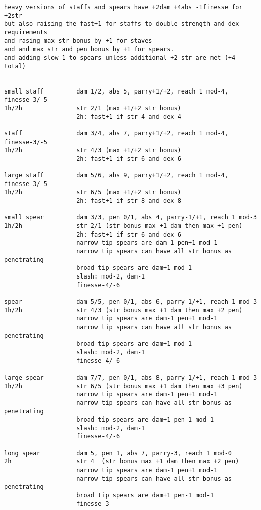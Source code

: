\begin{verbatim}
heavy versions of staffs and spears have +2dam +4abs -1finesse for +2str
but also raising the fast+1 for staffs to double strength and dex requirements
and rasing max str bonus by +1 for staves 
and and max str and pen bonus by +1 for spears.
and adding slow-1 to spears unless additional +2 str are met (+4 total)


small staff         dam 1/2, abs 5, parry+1/+2, reach 1 mod-4, finesse-3/-5
1h/2h               str 2/1 (max +1/+2 str bonus)
                    2h: fast+1 if str 4 and dex 4

staff               dam 3/4, abs 7, parry+1/+2, reach 1 mod-4, finesse-3/-5
1h/2h               str 4/3 (max +1/+2 str bonus)
                    2h: fast+1 if str 6 and dex 6

large staff         dam 5/6, abs 9, parry+1/+2, reach 1 mod-4, finesse-3/-5
1h/2h               str 6/5 (max +1/+2 str bonus)
                    2h: fast+1 if str 8 and dex 8

small spear         dam 3/3, pen 0/1, abs 4, parry-1/+1, reach 1 mod-3
1h/2h               str 2/1 (str bonus max +1 dam then max +1 pen)
                    2h: fast+1 if str 6 and dex 6
                    narrow tip spears are dam-1 pen+1 mod-1
                    narrow tip spears can have all str bonus as penetrating
                    broad tip spears are dam+1 mod-1
                    slash: mod-2, dam-1
                    finesse-4/-6

spear               dam 5/5, pen 0/1, abs 6, parry-1/+1, reach 1 mod-3
1h/2h               str 4/3 (str bonus max +1 dam then max +2 pen)
                    narrow tip spears are dam-1 pen+1 mod-1
                    narrow tip spears can have all str bonus as penetrating
                    broad tip spears are dam+1 mod-1
                    slash: mod-2, dam-1
                    finesse-4/-6

large spear         dam 7/7, pen 0/1, abs 8, parry-1/+1, reach 1 mod-3
1h/2h               str 6/5 (str bonus max +1 dam then max +3 pen)
                    narrow tip spears are dam-1 pen+1 mod-1
                    narrow tip spears can have all str bonus as penetrating
                    broad tip spears are dam+1 pen-1 mod-1
                    slash: mod-2, dam-1
                    finesse-4/-6

long spear          dam 5, pen 1, abs 7, parry-3, reach 1 mod-0
2h                  str 4  (str bonus max +1 dam then max +2 pen)
                    narrow tip spears are dam-1 pen+1 mod-1
                    narrow tip spears can have all str bonus as penetrating
                    broad tip spears are dam+1 pen-1 mod-1
                    finesse-3


\end{verbatim}
